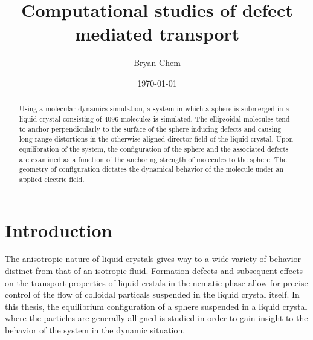 \documentclass[preprint, aps]{revtex4-1}
\begin{document}

\title{Computational studies of defect mediated transport}
\author{Bryan Chem}
\date{\today}

\begin{abstract}
Using a molecular dynamics simulation, a system in which a sphere is submerged 
in a liquid crystal consisting of 4096 molecules is simulated. The ellipsoidal 
molecules tend to anchor perpendicularly to the surface of the sphere inducing 
defects and causing long range distortions in the otherwise aligned director 
field of the liquid crystal. Upon equilibration of the system, the configuration 
of the sphere and the associated defects are examined as a function of the 
anchoring strength of molecules to the sphere. The geometry of configuration 
dictates the dynamical behavior of the molecule under an applied electric field.

\end{abstract}

\maketitle

\tableofcontents

\newpage

\section*{Introduction}
The anisotropic nature of liquid crystals gives way to a wide variety of 
behavior distinct from that of an isotropic fluid. Formation defects and
subsequent effects on the transport properties of liquid crstals in the nematic 
phase allow for precise control of the flow of colloidal particals suspended in
the liquid crystal itself. In this thesis, the equilibrium configuration of a 
sphere suspended in a liquid crystal where the particles are generally alligned 
is studied in order to gain insight to the behavior of the system in the dynamic
situation.
\end{document}
